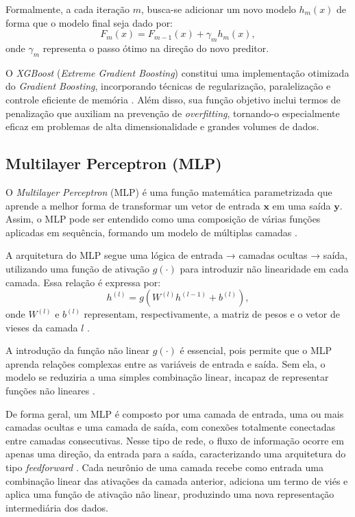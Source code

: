 Formalmente, a cada iteração \( m \), busca-se adicionar um novo modelo \( h_m(x) \) de forma que o modelo final seja dado por:
\[
F_m(x) = F_{m-1}(x) + \gamma_m h_m(x),
\]
onde \( \gamma_m \) representa o passo ótimo na direção do novo preditor.

O \textit{XGBoost} (\textit{Extreme Gradient Boosting}) constitui uma implementação otimizada do \textit{Gradient Boosting}, 
incorporando técnicas de regularização, paralelização e controle eficiente de memória \cite{Geron2019}. 
Além disso, sua função objetivo inclui termos de penalização que auxiliam na prevenção de \textit{overfitting}, 
tornando-o especialmente eficaz em problemas de alta dimensionalidade e grandes volumes de dados.

\subsection{Multilayer Perceptron (MLP)}

O \textit{Multilayer Perceptron} (MLP) é uma função matemática parametrizada que aprende a melhor forma de transformar um vetor de 
entrada \( \mathbf{x} \) em uma saída \( \mathbf{y} \). Assim, o MLP pode ser entendido como uma composição de várias funções aplicadas em sequência, 
formando um modelo de múltiplas camadas \cite{Goodfellow2016}.

A arquitetura do MLP segue uma lógica de entrada → camadas ocultas → saída, utilizando uma função de ativação \( g(\cdot) \) para 
introduzir não linearidade em cada camada. Essa relação é expressa por:
\[
h^{(l)} = g\!\left(W^{(l)}h^{(l-1)} + b^{(l)}\right),
\]
onde \( W^{(l)} \) e \( b^{(l)} \) representam, respectivamente, a matriz de pesos e o vetor de vieses da camada \( l \) \cite{Goodfellow2016}.

A introdução da função não linear \( g(\cdot) \) é essencial, pois permite que o MLP aprenda relações complexas entre as variáveis de entrada e saída. 
Sem ela, o modelo se reduziria a uma simples combinação linear, incapaz de representar funções não lineares \cite{Goodfellow2016}.

De forma geral, um MLP é composto por uma camada de entrada, uma ou mais camadas ocultas e uma camada de saída, com conexões totalmente conectadas entre camadas consecutivas. 
Nesse tipo de rede, o fluxo de informação ocorre em apenas uma direção, da entrada para a saída, caracterizando uma arquitetura do tipo \textit{feedforward} \cite{Geron2019}. 
Cada neurônio de uma camada recebe como entrada uma combinação linear das ativações da camada anterior, adiciona um termo de viés e aplica uma função de ativação não linear, 
produzindo uma nova representação intermediária dos dados.

